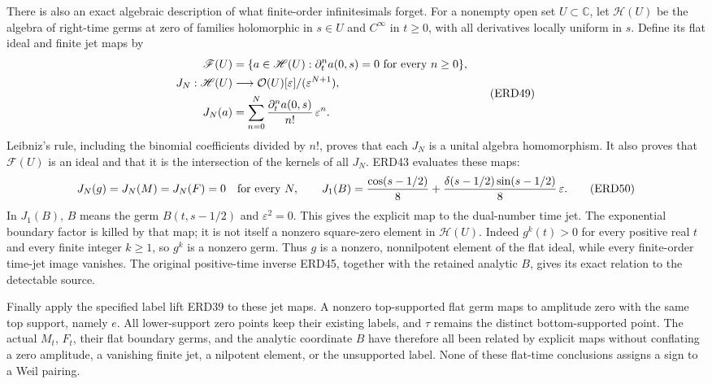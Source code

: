 \documentclass[
  10pt,
  a4paper,
]{article}
\begin{document}
There is also an exact algebraic description of what finite-order
infinitesimals forget. For a nonempty open set \(U\subset\mathbb C\),
let \(\mathscr H(U)\) be the algebra of right-time germs at zero of
families holomorphic in \(s\in U\) and \(C^\infty\) in \(t\ge0\), with
all derivatives locally uniform in \(s\). Define its flat ideal and
finite jet maps by \[
 \begin{aligned}
 \mathscr F(U)&=
   \{a\in\mathscr H(U):
        \partial_t^n a(0,s)=0\ \hbox{for every }n\ge0\},\\
 J_N:\mathscr H(U)&\longrightarrow
        \mathcal O(U)[\varepsilon]/(\varepsilon^{N+1}),\\
 J_N(a)&=\sum_{n=0}^N
       \frac{\partial_t^n a(0,s)}{n!}\,\varepsilon^n .
 \end{aligned}
 \tag{ERD49}
\] Leibniz's rule, including the binomial coefficients divided by
\(n!\), proves that each \(J_N\) is a unital algebra homomorphism. It
also proves that \(\mathscr F(U)\) is an ideal and that it is the
intersection of the kernels of all \(J_N\). ERD43 evaluates these maps:
\[
 J_N(g)=J_N(M)=J_N(F)=0
      \quad\hbox{for every }N,\qquad
 J_1(B)=\frac{\cos(s-1/2)}8
       +\frac{\delta(s-1/2)\sin(s-1/2)}8\,\varepsilon .
 \tag{ERD50}
\] In \(J_1(B)\), \(B\) means the germ \(B(t,s-1/2)\) and
\(\varepsilon^2=0\). This gives the explicit map to the dual-number time
jet. The exponential boundary factor is killed by that map; it is not
itself a nonzero square-zero element in \(\mathscr H(U)\). Indeed
\(g^k(t)>0\) for every positive real \(t\) and every finite integer
\(k\ge1\), so \(g^k\) is a nonzero germ. Thus \(g\) is a nonzero,
nonnilpotent element of the flat ideal, while every finite-order
time-jet image vanishes. The original positive-time inverse ERD45,
together with the retained analytic \(B\), gives its exact relation to
the detectable source.

Finally apply the specified label lift ERD39 to these jet maps. A
nonzero top-supported flat germ maps to amplitude zero with the same top
support, namely \(e\). All lower-support zero points keep their existing
labels, and \(\tau\) remains the distinct bottom-supported point. The
actual \(M_t\), \(F_t\), their flat boundary germs, and the analytic
coordinate \(B\) have therefore all been related by explicit maps
without conflating a zero amplitude, a vanishing finite jet, a nilpotent
element, or the unsupported label. None of these flat-time conclusions
assigns a sign to a Weil pairing.
\end{document}
